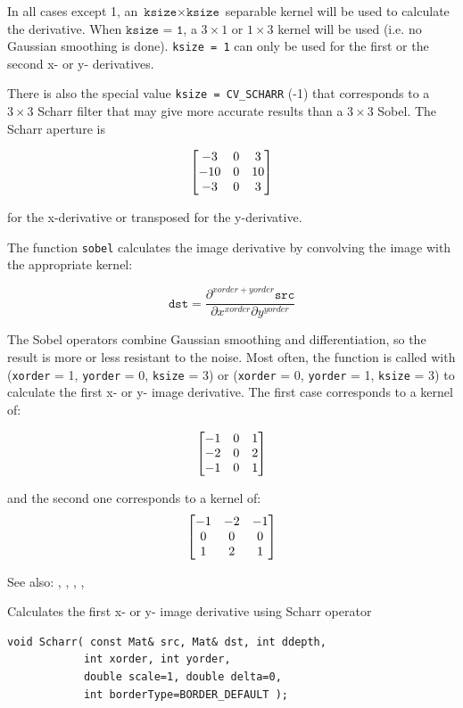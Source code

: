 In all cases except 1, an $\texttt{ksize} \times
\texttt{ksize}$ separable kernel will be used to calculate the
derivative. When $\texttt{ksize = 1}$, a $ 3 \times 1$ or $ 1 \times 3$
kernel will be used (i.e. no Gaussian smoothing is done). \texttt{ksize = 1} can only be used for the first or the second x- or y- derivatives.

There is also the special value \texttt{ksize = CV\_SCHARR} (-1) that corresponds to a $3\times3$ Scharr
filter that may give more accurate results than a $3\times3$ Sobel. The Scharr
aperture is

\[ \begin{bmatrix} -3 & 0 & 3\\ -10 & 0 & 10\\ -3 & 0 & 3 \end{bmatrix}
\]

for the x-derivative or transposed for the y-derivative.

The function \texttt{sobel} calculates the image derivative by convolving the image with the appropriate kernel:

\[
\texttt{dst} = \frac{\partial^{xorder+yorder} \texttt{src}}{\partial x^{xorder} \partial y^{yorder}}
\]

The Sobel operators combine Gaussian smoothing and differentiation,
so the result is more or less resistant to the noise. Most often,
the function is called with (\texttt{xorder} = 1, \texttt{yorder} = 0,
\texttt{ksize} = 3) or (\texttt{xorder} = 0, \texttt{yorder} = 1,
\texttt{ksize} = 3) to calculate the first x- or y- image
derivative. The first case corresponds to a kernel of:

\[ \begin{bmatrix} -1 & 0 & 1\\ -2 & 0 & 2\\ -1 & 0 & 1 \end{bmatrix}
\]

and the second one corresponds to a kernel of:
\[ \begin{bmatrix} -1 & -2 & -1\\ 0 & 0 & 0\\ 1 & 2 & 1 \end{bmatrix}
\]

See also: , , , , 

\label{Scharr}
Calculates the first x- or y- image derivative using Scharr operator

\begin{lstlisting}
void Scharr( const Mat& src, Mat& dst, int ddepth,
            int xorder, int yorder,
            double scale=1, double delta=0,
            int borderType=BORDER_DEFAULT );
\end{lstlisting}
\begin{description}
\end{description}

